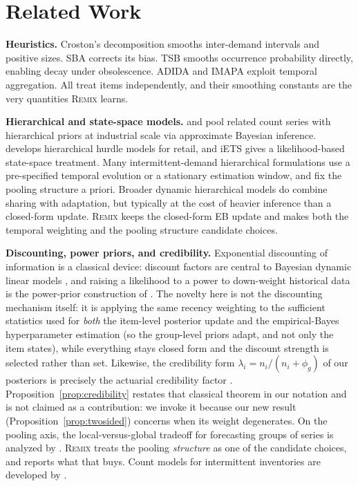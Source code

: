\documentclass[twocolumn,10pt]{article}
\newcommand{\REMIX}{\textsc{Remix}}
\begin{document}
\section{Related Work}\label{sec:related}

\textbf{Heuristics.} Croston's decomposition \citep{croston1972} smooths
inter-demand intervals and positive sizes. SBA \citep{syntetos2005accuracy}
corrects its bias. TSB \citep{teunter2011} smooths occurrence probability
directly, enabling decay under obsolescence. ADIDA
\citep{nikolopoulos2011} and IMAPA \citep{kourentzes2016} exploit temporal
aggregation. All treat items independently, and their smoothing constants
are the very quantities \REMIX{} learns.

\textbf{Hierarchical and state-space models.} \citet{chapados2014} and
\citet{seeger2016} pool related count series with hierarchical priors at
industrial scale via approximate Bayesian inference. \citet{pitkin2024}
develops hierarchical hurdle models for retail, and iETS
\citep{svetunkov2023iets} gives a likelihood-based state-space treatment.
Many intermittent-demand hierarchical formulations use a pre-specified
temporal evolution or a stationary estimation window, and fix the pooling
structure a priori. Broader dynamic hierarchical models
\citep{westharrison1997} do combine sharing with adaptation, but typically
at the cost of heavier inference than a closed-form update. \REMIX{} keeps
the closed-form EB update and makes both the temporal weighting and the
pooling structure candidate choices.

\textbf{Discounting, power priors, and credibility.} Exponential
discounting of information is a classical device: discount factors are
central to Bayesian dynamic linear models \citep{westharrison1997}, and
raising a likelihood to a power to down-weight historical data is the
power-prior construction of \citet{ibrahimchen2000}. The novelty here is
not the discounting mechanism itself: it is applying the same recency
weighting to the sufficient statistics used for \emph{both} the
item-level posterior update and the empirical-Bayes hyperparameter
estimation (so the group-level priors adapt, and not only the item
states), while everything stays closed form and the discount strength is
selected rather than set. Likewise, the credibility form
$\lambda_i=n_i/(n_i+\phi_g)$ of our posteriors is precisely the actuarial
credibility factor \citep{buhlmann1967}. Proposition~\ref{prop:credibility}
restates that classical theorem in our notation and is not claimed as a
contribution: we invoke it because our new result
(Proposition~\ref{prop:twosided}) concerns when its weight degenerates. On the pooling axis, the local-versus-global tradeoff for
forecasting groups of series is analyzed by
\citet{monteromanso2021}. \REMIX{} treats the pooling \emph{structure}
as one of the candidate choices, and reports what that buys. Count models for intermittent
inventories are developed by \citet{snyder2012}.
\end{document}
